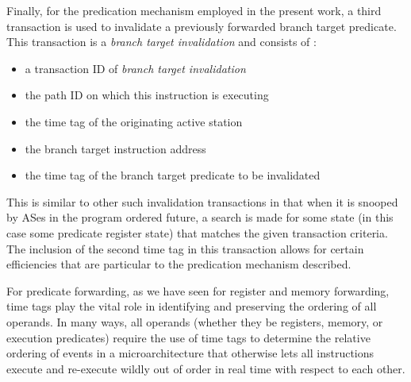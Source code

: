 \documentclass[10pt,dvips]{article}
\begin{document}
Finally, for the predication mechanism employed in the present
work, a third transaction is used to invalidate a previously
forwarded branch target predicate.  This transaction is
a \textit{branch target invalidation} and consists of :
%
\vspace{-0.05in}
\begin{itemize}
\vspace{-0.1in}
\item{a transaction ID of \textit{branch target invalidation}}
\vspace{-0.1in}
\item{the path ID on which this instruction is executing}
\vspace{-0.1in}
\item{the time tag of the originating active station}
\vspace{-0.1in}
\item{the branch target instruction address}
\vspace{-0.1in}
\item{the time tag of the branch target predicate to be invalidated}
\vspace{-0.1in}
\end{itemize}   
%
This is similar to other such invalidation transactions in
that when it is snooped by ASes in the program ordered future,
a search is made for some state (in this case some predicate
register state) that matches the given transaction criteria.
The inclusion of the second time tag in this transaction allows
for certain efficiencies that are particular to the predication
mechanism described.

For predicate forwarding, as we have seen for register and
memory forwarding, time tags play the vital role in
identifying and preserving the ordering of all operands.
In many ways, all operands (whether they be registers, memory,
or execution predicates) require the use of time tags to
determine the relative ordering of events in a microarchitecture
that otherwise lets all instructions execute and re-execute
wildly out of order in real time with respect to each other.
%
%
\end{document}
